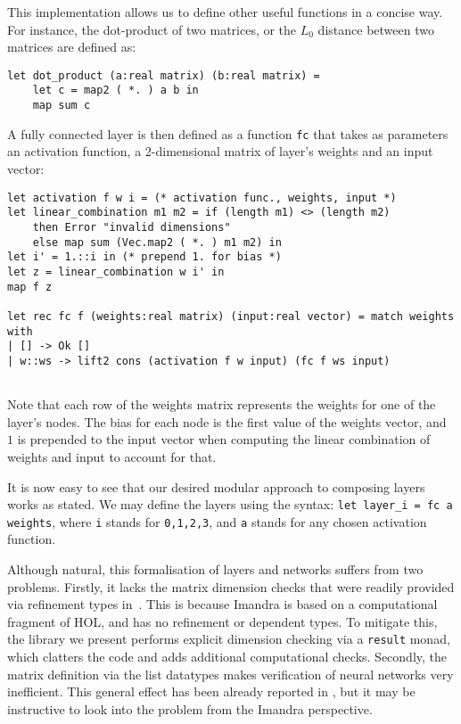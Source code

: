 \documentclass[runningheads]{llncs}
\begin{document}
This implementation allows us to define other useful functions in a concise way. For instance, the dot-product of two matrices, or the $L_0$ distance between two matrices are defined as:

\begin{lstlisting}[frame=none, language=caml]
let dot_product (a:real matrix) (b:real matrix) =
	let c = map2 ( *. ) a b in
	map sum c
\end{lstlisting}




A fully connected layer is then defined as a function \lstinline{fc} that takes
as parameters an activation function, a 2-dimensional matrix of
layer's weights and an input vector:
\begin{lstlisting}[caption=Fully connected layer implementation, language=caml, label={lst:fully_connected}]
let activation f w i = (* activation func., weights, input *)
let linear_combination m1 m2 = if (length m1) <> (length m2)
    then Error "invalid dimensions" 
    else map sum (Vec.map2 ( *. ) m1 m2) in
let i' = 1.::i in (* prepend 1. for bias *)
let z = linear_combination w i' in
map f z
	
let rec fc f (weights:real matrix) (input:real vector) = match weights with
| [] -> Ok []
| w::ws -> lift2 cons (activation f w input) (fc f ws input)
	
\end{lstlisting} 

Note that each row of the weights matrix
represents the weights for one of the layer's nodes. The bias for each node is
the first value of the weights vector, and $1$ is prepended to the input vector
when computing the linear combination of weights and input to account for that.



  It is now easy to see that our desired modular approach to composing layers works as stated. We may define the layers using the syntax:
  \lstinline{let layer_i = fc a weights}, where \lstinline{i} stands for \lstinline{0,1,2,3}, and \lstinline{a} stands for any chosen activation function. 

  Although natural, this formalisation of layers and networks suffers from two problems.  Firstly, it lacks the matrix dimension checks that were readily provided  via refinement types in~\cite{KokkeKKAA20}. This is because Imandra is based on a computational fragment of HOL, and has no refinement or dependent types. To mitigate this, the library we present performs explicit dimension checking via a {\tt result} monad, which clatters the code and adds additional computational checks.
  Secondly, the matrix definition via the list datatypes makes verification of neural networks very inefficient.
  This general effect has been already reported in \cite{KokkeKKAA20}, but it may be instructive to look into the problem from the Imandra perspective.
\end{document}
